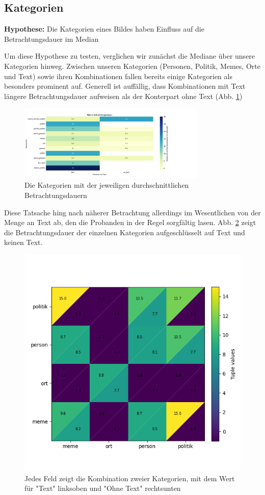 \documentclass[
    language=german, %
    thesis=seminar, %
    supervisor=postdoc, %
    multiauthor=true, %
    ]{settings/csssa-thesis}
\begin{document}
\subsection{Kategorien}
\textbf{Hypothese:} Die Kategorien eines Bildes haben Einfluss auf die Betrachtungsdauer im Median 

Um diese Hypothese zu testen, verglichen wir zunächst die Mediane über unsere Kategorien hinweg. 
Zwischen unseren Kategorien (Personen, Politik, Memes, Orte und Text) sowie ihren Kombinationen 
fallen bereits einige Kategorien als besonders prominent auf. Generell ist auffällig, dass 
Kombinationen mit Text längere Betrachtungsdauer aufweisen als der Konterpart ohne Text (Abb. \ref{fig:katDauer}) 

\begin{figure}[ht]
    \centering
    \includegraphics[width=0.8\textwidth,height=0.8\textheight,keepaspectratio]{figures/Bild2.png}
    \caption{Die Kategorien mit der jeweiligen durchschnittlichen Betrachtungsdauern}\label{fig:katDauer}
\end{figure}

Diese Tatsache hing nach näherer Betrachtung allerdings im Wesentlichen von der Menge an Text ab,
den die Probanden in der Regel sorgfältig lasen. Abb. \ref{fig:katMatrix} zeigt die Betrachtungsdauer der einzelnen 
Kategorien aufgeschlüsselt auf Text und keinen Text. 

\begin{figure}[h]
    \centering
    \includegraphics[width=0.8\linewidth,height=0.8\textheight,keepaspectratio]{figures/Bild3.png}
    \caption{Jedes Feld zeigt die Kombination zweier Kategorien, mit dem Wert für "Text" linksoben und "Ohne Text" rechtsunten}\label{fig:katMatrix}
\end{figure}
\end{document}
